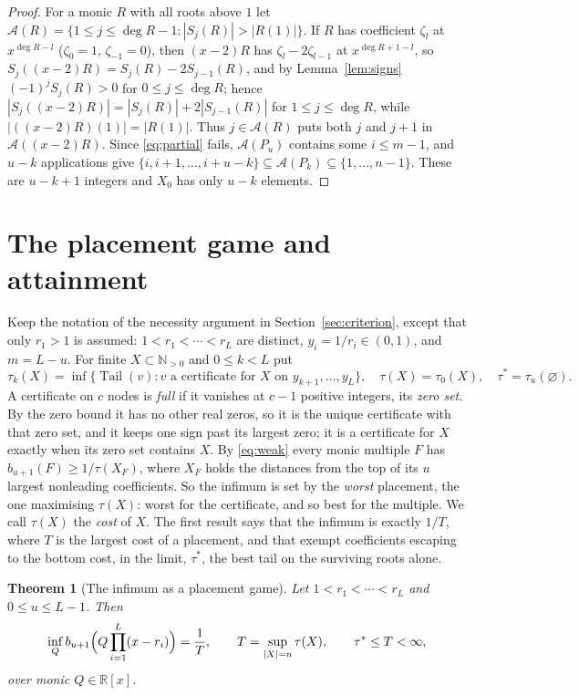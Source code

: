 \documentclass[11pt]{article}
\newtheorem{theorem}{Theorem}[section]
\theoremstyle{definition}
\theoremstyle{plain}
\newcommand{\R}{\mathbb R}
\newcommand{\N}{\mathbb N}
\DeclareMathOperator{\Tail}{Tail}
\begin{document}
\begin{proof}
For a monic $R$ with all roots above $1$ let
$\mathcal A(R)=\{1\le j\le\deg R-1:|S_j(R)|>|R(1)|\}$.  If $R$ has
coefficient $\zeta_l$ at $x^{\deg R-l}$ ($\zeta_0=1$, $\zeta_{-1}=0$), then
$(x-2)R$ has $\zeta_l-2\zeta_{l-1}$ at $x^{\deg R+1-l}$, so
$S_j((x-2)R)=S_j(R)-2S_{j-1}(R)$, and by Lemma~\ref{lem:signs}
$(-1)^jS_j(R)>0$ for $0\le j\le\deg R$; hence
$|S_j((x-2)R)|=|S_j(R)|+2|S_{j-1}(R)|$ for $1\le j\le\deg R$, while
$|((x-2)R)(1)|=|R(1)|$.  Thus $j\in\mathcal A(R)$ puts both $j$ and $j+1$ in
$\mathcal A((x-2)R)$.  Since \eqref{eq:partial} fails, $\mathcal A(P_u)$
contains some $i\le m-1$, and $u-k$ applications give
$\{i,i+1,\ldots,i+u-k\}\subseteq\mathcal A(P_k)\subseteq\{1,\ldots,n-1\}$.
These are $u-k+1$ integers and $X_0$ has only $u-k$ elements.
\end{proof}

\section{The placement game and attainment}\label{sec:value}

Keep the notation of the necessity argument in
Section~\ref{sec:criterion}, except that only $r_1>1$ is assumed: $1<r_1<\cdots<r_L$
are distinct, $y_i=1/r_i\in(0,1)$, and $m=L-u$.  For finite $X\subset\N_{>0}$ and
$0\le k<L$ put
\[
  \tau_k(X)=\inf\bigl\{\Tail(v):v\text{ a certificate for }X\text{ on }
  y_{k+1},\ldots,y_L\bigr\},
  \quad \tau(X)=\tau_0(X),\quad \tau^*=\tau_u(\varnothing).
\]
A certificate on $c$ nodes is \emph{full} if it vanishes at $c-1$ positive
integers, its \emph{zero set}.  By the zero bound it has no other real zeros,
so it is the unique certificate with that zero set, and it keeps one sign
past its largest zero; it is a certificate for $X$ exactly when its zero set
contains $X$.  By \eqref{eq:weak} every monic multiple $F$ has
$b_{u+1}(F)\ge1/\tau(X_F)$, where $X_F$ holds the distances from the top of
its $u$ largest nonleading coefficients.  So the infimum is set by the \emph{worst}
placement, the one maximising $\tau(X)$: worst for the certificate, and so
best for the multiple.  We call $\tau(X)$ the \emph{cost} of $X$.  The
first result says that the infimum is exactly $1/T$, where $T$ is the largest
cost of a placement, and that exempt coefficients escaping to the bottom
cost, in the limit, $\tau^*$, the best tail on the surviving roots alone.

\begin{theorem}[The infimum as a placement game]\label{thm:value}
Let $1<r_1<\cdots<r_L$ and $0\le u\le L-1$.  Then
\[
  \inf_Qb_{u+1}\Bigl(Q\prod_{i=1}^L(x-r_i)\Bigr)=\frac1T,
  \qquad T=\sup_{|X|=u}\tau(X),\qquad \tau^*\le T<\infty,
\]
over monic $Q\in\R[x]$.
\end{theorem}
\end{document}
